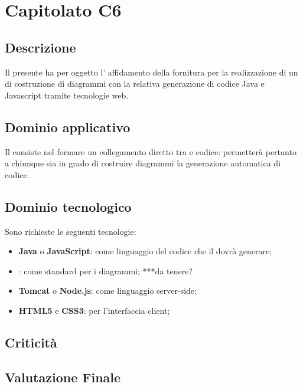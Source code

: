\section {Capitolato C6}
	\subsection {Descrizione}
	Il presente  ha per oggetto l’ affidamento della fornitura per la realizzazione
di un  di costruzione di diagrammi  con la relativa generazione di codice
Java e Javascript tramite tecnologie web.
	\subsection {Dominio applicativo}
	Il  consiste nel formare un collegamento diretto tra  e codice: permetterà pertanto a chiunque sia in grado di costruire diagrammi  la generazione automatica di codice.
	\subsection {Dominio tecnologico}
	Sono richieste le seguenti tecnologie:
	\begin {itemize}
	\item \textbf{Java} o \textbf{JavaScript}: come linguaggio del codice che il  dovrà generare;
	\item \textbf{}: come standard per i diagrammi; ***da tenere?
	\item \textbf{Tomcat} o \textbf{Node.js}: come linguaggio server-side;
	\item \textbf{HTML5} e \textbf{CSS3}: per l'interfaccia client;
	\end {itemize}
	\subsection {Criticità}
	\subsection {Valutazione Finale}